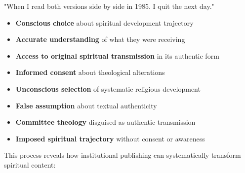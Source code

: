 \documentclass[12pt,twoside]{book}
\begin{document}
"When I read both versions side by side in 1985. I quit the next day."

\begin{itemize}
\item \textbf{\textbf{Conscious choice}} about spiritual development trajectory
\item \textbf{\textbf{Accurate understanding}} of what they were receiving
\item \textbf{\textbf{Access to original spiritual transmission}} in its authentic form
\item \textbf{\textbf{Informed consent}} about theological alterations

\item \textbf{\textbf{Unconscious selection}} of systematic religious development
\item \textbf{\textbf{False assumption}} about textual authenticity
\item \textbf{\textbf{Committee theology}} disguised as authentic transmission
\item \textbf{\textbf{Imposed spiritual trajectory}} without consent or awareness
\end{itemize}

This process reveals how institutional publishing can systematically transform spiritual content:
\end{document}
